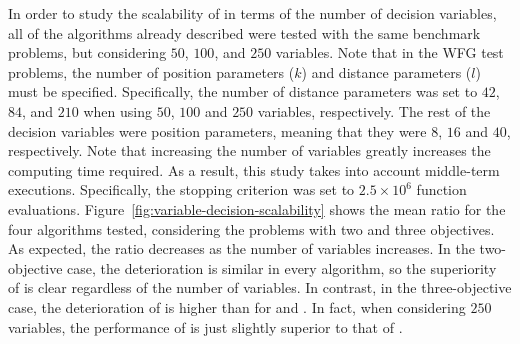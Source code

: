 In order to study the scalability of \VSDMOEA{} in terms of the number of decision variables, all of the algorithms already described were tested with
the same benchmark problems, but considering $50$, $100$, and $250$ variables.
%
Note that in the WFG test problems, the number of position parameters ($k$) and distance parameters ($l$) must be specified.
%
Specifically, the number of distance parameters was set to $42$, $84$, and $210$ when using $50$, $100$ and $250$ variables, respectively.
%
The rest of the decision variables were position parameters, meaning that they were $8$, $16$ and $40$, respectively.
%
Note that increasing the number of variables greatly increases the computing time required.
%
As a result, this study takes into account middle-term executions.
%
Specifically, the stopping criterion was set to $2.5 \times 10^6$ function evaluations.
%
Figure~\ref{fig:variable-decision-scalability} shows the mean \HV{} ratio for the four algorithms tested,
considering the problems with two and three objectives.
%
As expected, the \HV{} ratio decreases as the number of variables increases.
%
In the two-objective case, the deterioration is similar in every algorithm, so the superiority of \VSDMOEA{} is clear regardless of the number of 
variables.
%
In contrast, in the three-objective case, the deterioration of \VSDMOEA{} is higher than for \RMOEA{} and \MOEAD{}.
%
In fact, when considering $250$ variables, the performance of \VSDMOEA{} is just slightly superior to that of \RMOEA{}.

